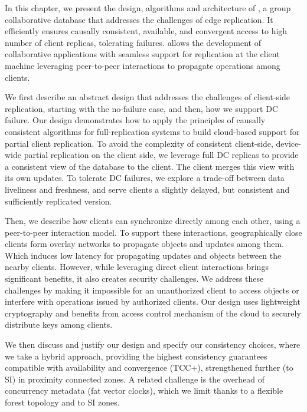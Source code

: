 
In this chapter, we present the design, algorithms and architecture of \system{},
a group collaborative database that addresses the challenges of edge replication.
It efficiently ensures causally consistent, available, and convergent access to
high number of client replicas, tolerating failures.
\system{} allows the development of collaborative applications with seamless support for replication at the client machine leveraging peer-to-peer interactions to propagate operations among clients.

We first describe an abstract design that addresses the challenges of client-side replication, starting with the no-failure case, and then, how we support DC failure. Our design demonstrates how to apply the principles of causally consistent algorithms for full-replication systems to build cloud-based support for partial client replication.
To avoid the complexity of consistent client-side, device-wide partial replication on the client side, we leverage full DC replicas to provide a consistent view of the database to the client. The client merges this view with its own updates. To tolerate DC failures, we explore a trade-off between data liveliness and freshness, and serve clients a slightly delayed, but consistent and sufficiently replicated version.

Then, we describe how \system{} clients can synchronize directly among each other, using a peer-to-peer interaction model. To support these interactions, geographically close clients form overlay networks to propagate objects and updates among them. Which induces low latency for propagating updates and objects between the nearby clients. However, while leveraging direct client interactions brings significant benefits, it also creates security challenges. We address these challenges by making it impossible for an unauthorized client to access objects or interfere with operations issued by authorized clients. Our design uses lightweight cryptography and benefits from access control mechanism of the cloud to securely distribute keys among clients.

We then discuss and justify our design and specify our consistency choices, where we take a hybrid approach, providing the highest consistency guarantees compatible with availability and convergence (TCC+), strengthened further (to SI) in proximity connected zones. A related challenge is the overhead of concurrency metadata (fat vector clocks), which we limit thanks to a flexible forest topology and to SI zones.

